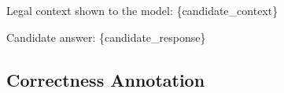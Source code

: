 \documentclass{article}
\theoremstyle{plain}
\theoremstyle{definition}
\theoremstyle{remark}
\begin{document}
{\begin{minipage}{0.94\textwidth}
Legal context shown to the model:\newline
\textasciigrave{}\textasciigrave{}\textasciigrave{}\newline
\{candidate\_context\}\newline
\textasciigrave{}\textasciigrave{}\textasciigrave{}\par
\vspace{0.55em}
Candidate answer:\newline
\textasciigrave{}\textasciigrave{}\textasciigrave{}\newline
\{candidate\_response\}\newline
\textasciigrave{}\textasciigrave{}\textasciigrave{}\par
\end{minipage}%
}
\endgroup

\clearpage
\subsection*{Correctness Annotation}
\begingroup
\setlength{\fboxsep}{10pt}
\setlength{\fboxrule}{0.8pt}
\end{document}

